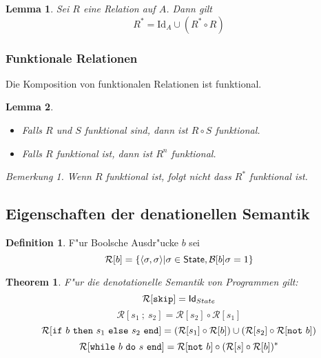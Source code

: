 \documentclass[german,10pt, a4paper, twocolumn]{scrartcl}
\newtheorem{lemma}{Lemma}[section]
\newtheorem{theorem}{Theorem}[section]
\theoremstyle{definition}
\newtheorem{definition}{Definition}[section]
\theoremstyle{remark}
\newtheorem*{remark}{Bemerkung}
\begin{document}
\begin{lemma}
	Sei $R$ eine Relation auf $A$. Dann gilt
	\begin{displaymath}
		R^* = \mbox{Id}_A \cup (R^* \circ R)
	\end{displaymath}
\end{lemma}

\subsubsection{Funktionale Relationen}

Die Komposition von funktionalen Relationen ist funktional.

\begin{lemma}\ 
	\begin{itemize}
		\item Falls $R$ und $S$ funktional sind, dann ist $R\circ S$ funktional.
		\item Falls $R$ funktional ist, dann ist $R^n$ funktional.
	\end{itemize}
	\begin{remark}
		Wenn $R$ funktional ist, folgt nicht dass $R^*$ funktional ist.
	\end{remark}
\end{lemma}

\subsection{Eigenschaften der denationellen Semantik}

\begin{definition}
	F"ur Boolsche Ausdr"ucke $b$ sei
	\begin{displaymath}
		\mathcal{R}[b] = \{ \langle \sigma,\sigma \rangle | \sigma \in \mbox{\sffamily State}, \mathcal{B}[b]\sigma = 1 \}
	\end{displaymath}
\end{definition}

\begin{theorem}
	F"ur die denotationelle Semantik von Programmen gilt:
	\small
	\begin{displaymath}
		\mathcal{R}[\mbox{\tt skip}] = \mbox{\sf Id}_{State}
	\end{displaymath}
	\begin{displaymath}
		\mathcal{R}[s_1\ ;\ s_2] = \mathcal{R}[s_2]\circ \mathcal{R}[s_1]
	\end{displaymath}
	\begin{displaymath}
		\mathcal{R}[\mbox{\tt if}\ b\ \mbox{\tt then}\ s_1\ \mbox{\tt else}\ s_2\ \mbox{\tt end}] = (\mathcal{R}[s_1]\circ \mathcal{R}[b])\cup (\mathcal{R}[s_2]\circ \mathcal{R}[\mbox{\tt not}\ b])
	\end{displaymath}
	\begin{displaymath}
		\mathcal{R}[\mbox{\tt while}\ b\ \mbox{\tt do}\ s\ \mbox{\tt end}] = \mathcal{R}[\mbox{\tt not}\ b]\circ (\mathcal{R}[s]\circ \mathcal{R}[b])^*
	\end{displaymath}
	\normalsize
\end{theorem}
\end{document}
